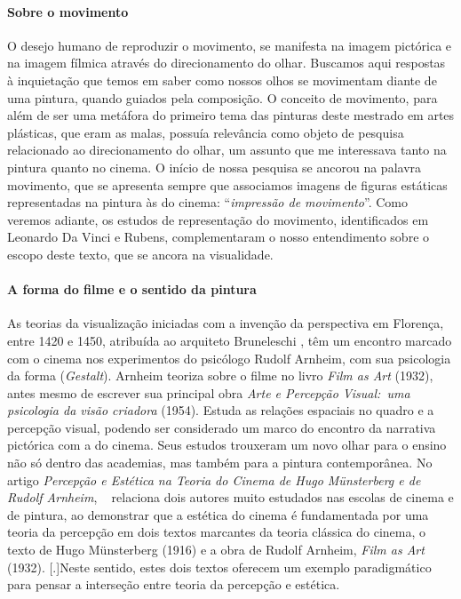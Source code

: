 \paragraph{Sobre o movimento} O desejo humano de reproduzir o movimento, se manifesta na imagem
pictórica e na imagem fílmica através do direcionamento do olhar.
Buscamos aqui respostas à inquietação que temos em saber como nossos
olhos se movimentam diante de uma pintura, quando guiados pela
composição. O conceito de movimento, para além de ser uma metáfora do
primeiro tema das pinturas deste mestrado em artes plásticas, que eram
as malas, possuía relevância como objeto de pesquisa relacionado ao
direcionamento do olhar, um assunto que me interessava tanto na pintura
quanto no cinema. O início de nossa pesquisa se ancorou na palavra
movimento, que se apresenta sempre que associamos imagens de figuras
estáticas representadas na pintura às do cinema:
\enquote{\emph{impressão de movimento}}. Como veremos adiante, os
estudos de representação do movimento, identificados em Leonardo Da
Vinci e Rubens, complementaram o nosso entendimento sobre o escopo
deste texto, que se ancora na visualidade.

\paragraph{A forma do filme e o sentido da pintura}
As teorias da visualização iniciadas com a invenção da perspectiva em
Florença, entre 1420 e 1450, atribuída ao arquiteto Bruneleschi
\parencite{arasse2016historias}, têm um encontro marcado com o cinema nos experimentos
do psicólogo Rudolf Arnheim, com sua psicologia da forma
(\emph{Gestalt}). Arnheim teoriza sobre o filme no livro \emph{Film as
	Art} (1932), antes mesmo de escrever sua principal obra \emph{Arte e
	Percepção Visual:~uma psicologia da visão criadora} (1954).
Estuda as relações espaciais no quadro e a percepção visual,
podendo ser considerado um marco do encontro da narrativa pictórica com
a do cinema. Seus estudos trouxeram um novo olhar para o ensino não só
dentro das academias, mas também para a pintura contemporânea. No
artigo \emph{Percepção e Estética na Teoria do Cinema de Hugo
	Münsterberg e de Rudolf Arnheim}, \citeauthor{pedro2013percepcao}~\cite*{pedro2013percepcao}
relaciona dois autores muito estudados nas escolas de cinema e de pintura, ao
demonstrar que a estética do cinema é fundamentada por uma teoria da
percepção em dois textos marcantes da teoria clássica do cinema, o
texto de Hugo Münsterberg (1916) e a obra de Rudolf Arnheim, \emph{Film
	as Art} (1932). {Neste sentido,
	estes dois textos oferecem um exemplo paradigmático para pensar a
	interseção entre teoria da percepção e estética}.

